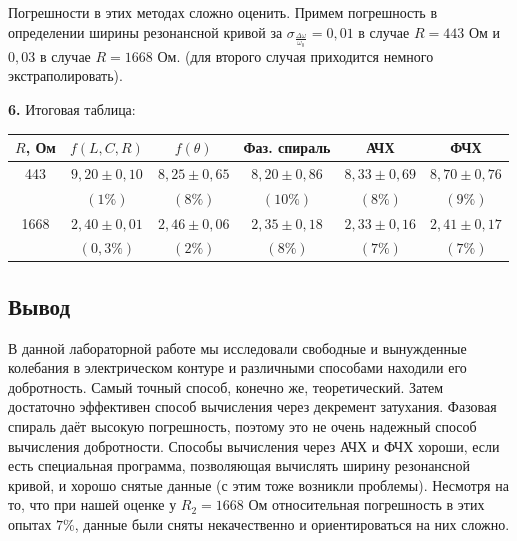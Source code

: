 \documentclass[a4paper, 12pt]{article}
\begin{document}
	Погрешности в этих методах сложно оценить. Примем погрешность в определении ширины резонансной кривой за $\sigma_{\frac{\Delta \omega}{\omega_0}} = 0,01$ в случае $R = 443$ Ом и $0,03$ в случае $R = 1668$ Ом. (для второго случая приходится немного экстраполировать).
	
	\newpage
	\textbf{6.} Итоговая таблица:
	\begin{table}[h]
		\centering
		\begin{tabular}{|c|c|c|c|c|c|}
			\hline
			$R$, Ом & $f(L, C, R)$ & $f(\theta)$ & Фаз. спираль & АЧХ & ФЧХ \\ \hline
			443 & $9,20 \pm 0,10$ & $8,25 \pm 0,65$& $8,20 \pm 0,86$ & $8,33 \pm 0,69$ & $8,70\pm 0,76$ \\
			& $(1\%)$ & $(8\%)$ & $(10\%)$ & $(8\%)$ & $(9\%)$  \\ \hline
			1668 & $2,40 \pm 0,01$ & $ 2,46 \pm 0,06$ & $ 2,35 \pm 0,18$ & $2,33 \pm 0,16  $ & $2,41 \pm 0,17 $ \\
			& $(0,3 \%)$ & $(2\%) $ & $(8\%) $ & $(7 \%) $ & $(7 \%) $ \\ \hline
		\end{tabular}
	\end{table}
	
	\subsection*{Вывод}
	 В данной лабораторной работе мы исследовали свободные и вынужденные колебания в электрическом контуре и различными способами находили его добротность. Самый точный способ, конечно же, теоретический. Затем достаточно эффективен способ вычисления через декремент затухания. Фазовая спираль даёт высокую погрешность, поэтому это не очень надежный способ вычисления добротности. Способы вычисления через АЧХ и ФЧХ хороши, если есть специальная программа, позволяющая вычислять ширину резонансной кривой, и хорошо снятые данные (с этим тоже возникли проблемы). Несмотря на то, что при нашей оценке у $R_2 = 1668$ Ом относительная погрешность в этих опытах $7 \%$, данные были сняты некачественно и ориентироваться на них сложно.
\end{document}
